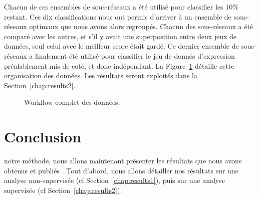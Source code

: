 			Chacun de ces ensembles de sous-réseaux a été utilisé pour classifier les 10\% restant.
			Ces dix classifications nous ont permis d'arriver à un ensemble de sous-réseaux optimaux que nous avons alors regroupés.
			Chacun des sous-réseaux a été comparé avec les autres, et s'il y avait une superposition entre deux jeux de données, seul celui avec le meilleur score était gardé.
			Ce dernier ensemble de sous-réseaux a finalement été utilisé pour classifier le jeu de donnés d'expression préalablement mis de coté, et donc indépendant.
			La Figure~\ref{fig:Workflow} détaille cette organisation des données.
			Les résultats seront exploités dans la Section~\ref{chap:results2}.

			\begin{figure}
				\begin{center}
					\def\svgwidth{\columnwidth}
					\caption{Workflow complet des données.}
					\label{fig:Workflow}
				\end{center}
			\end{figure}

\pagebreak

	\section{\textcolor{green!45!black}{Conclusion}}
		 notre méthode, nous allons maintenant présenter les résultats que nous avons obtenus et publiés \citet{Garcia2011,Garcia2012}. Tout d'abord, nous allons détailler nos résultats sur une analyse non-supervisée (cf Section~\ref{chap:results1}), puis sur une analyse supervisée (cf Section~\ref{chap:results2}).